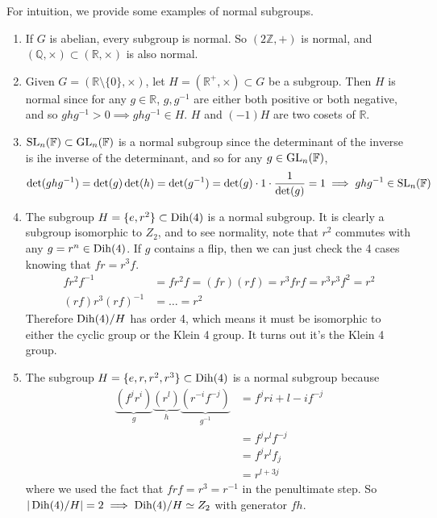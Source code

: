   \begin{example}
    For intuition, we provide some examples of normal subgroups. 
    \begin{enumerate}
      \item If $G$ is abelian, every subgroup is normal. So $(2\mathbb{Z}, +)$ is normal, and $(\mathbb{Q}, \times) \subset (\mathbb{R}, \times)$ is also normal. 
      \item Given $G = (\mathbb{R} \setminus \{0\}, \times)$, let $H = (\mathbb{R}^+, \times) \subset G$ be a subgroup. Then $H$ is normal since for any $g \in \mathbb{R}$, $g, g^{-1}$ are either both positive or both negative, and so $g h g^{-1} > 0 \implies g h g^{-1} \in H$. $H$ and $(-1)H$ are two cosets of $\mathbb{R}$. 
      \item $\operatorname{SL}_n (\mathbb{F}) \subset \operatorname{GL}_n (\mathbb{F})$ is a normal subgroup since the determinant of the inverse is ihe inverse of the determinant, and so for any $g \in \operatorname{GL}_n (\mathbb{F})$, 
      \begin{equation}
        \det(g h g^{-1}) = \det(g) \det(h) = \det(g^{-1}) = \det(g) \cdot 1 \cdot \frac{1}{\det(g)} = 1 \implies g h g^{-1} \in \operatorname{SL}_n (\mathbb{F}) 
      \end{equation}

      \item The subgroup $H = \{e, r^2\} \subset \operatorname{Dih}(4)$ is a normal subgroup. It is clearly a subgroup isomorphic to $Z_2$, and to see normality, note that $r^2$ commutes with any $g = r^n \in \operatorname{Dih}(4)$. If $g$ contains a flip, then we can just check the 4 cases knowing that $f r = r^3 f$. 
      \begin{align}
        f r^2 f^{-1} & = f r^2 f = (f r)(r f) = r^3 f r f = r^3 r^3 f^2 = r^2 \\ 
        (rf) r^3 (rf)^{-1} & = \ldots = r^2
      \end{align}
      Therefore $\operatorname{Dih}(4)/H$ has order 4, which means it must be isomorphic to either the cyclic group or the Klein 4 group. It turns out it's the Klein 4 group. 

      \item The subgroup $H = \{e, r, r^2, r^3 \} \subset \operatorname{Dih}(4)$ is a normal subgroup because 
      \begin{align}
        \underbrace{(f^j r^i)}_{g} \underbrace{(r^l)}_{h} 
        \underbrace{(r^{-i} f^{-j})}_{g^{-1}} & = f^j r{i + l - i} f^{-j} \\  
                                              & = f^j r^l f^{-j} \\
                                              & = f^j r^l f_j \\
                                              & = r^{l + 3j}
      \end{align}
      where we used the fact that $frf = r^3 = r^{-1}$ in the penultimate step. So $|\operatorname{Dih}(4)/H| = 2 \implies \operatorname{Dih}(4)/H \simeq Z_2$ with generator $fh$. 
    \end{enumerate}
  \end{example}

